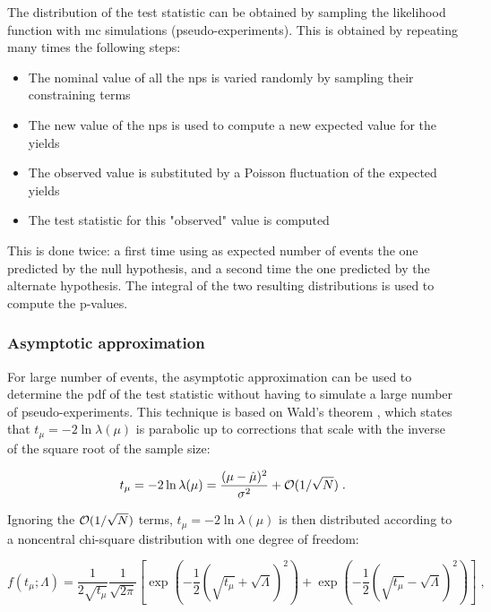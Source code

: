The distribution of the test statistic can be obtained by sampling the likelihood function with \gls{mc} simulations (pseudo-experiments). This is obtained by repeating many times the following steps:
\begin{itemize}
\item The nominal value of all the \glspl{np} is varied randomly by sampling their constraining terms 
\item The new value of the \glspl{np} is used to compute a new expected value for the yields
\item The observed value is substituted by a Poisson fluctuation of the expected yields
\item The test statistic for this "observed" value is computed
\end{itemize}

This is done twice: a first time using as expected number of events the one predicted by the null hypothesis, and a second time the one predicted by the alternate hypothesis. The integral of the two resulting distributions is used to compute the p-values.

\subsubsection*{Asymptotic approximation}
For large number of events, the asymptotic approximation \cite{Cowan2011} can be used to determine the \gls{pdf} of the test statistic without having to simulate a large number of pseudo-experiments. This technique is based on  Wald's theorem \cite{Wald1943}, which states that $t_{\mu} = -2 \ln \lambda(\mu)$ is parabolic up to corrections that scale with the inverse of the square root of the sample size:

\begin{equation}
\label{eq:wald}
t_{\mu} = -2 \ln \lambda(\mu)
= \frac{(\mu - \hat{\mu})^2}{\sigma^2} + {\cal  O}(1/\sqrt{N}) \;.
\end{equation}

\noindent Ignoring the ${\cal  O}(1/\sqrt{N})$ terms, $t_{\mu} = -2 \ln \lambda(\mu)$ is then distributed according to a noncentral chi-square distribution with one degree of freedom:

\begin{equation}
\label{eq:stat:ftmulambda}
f(t_{\mu};\Lambda) = \frac{1}{2 \sqrt{t_{\mu}}} \frac{1}{\sqrt{2 \pi}}
\left[ \exp \left( - \frac{1}{2}
\left( \sqrt{t_{\mu}} + \sqrt{\Lambda} \right)^2 \right) +
\exp \left( - \frac{1}{2} \left( \sqrt{t_{\mu}} - \sqrt{\Lambda} \right)^2
\right) \right] \;,
\end{equation}

